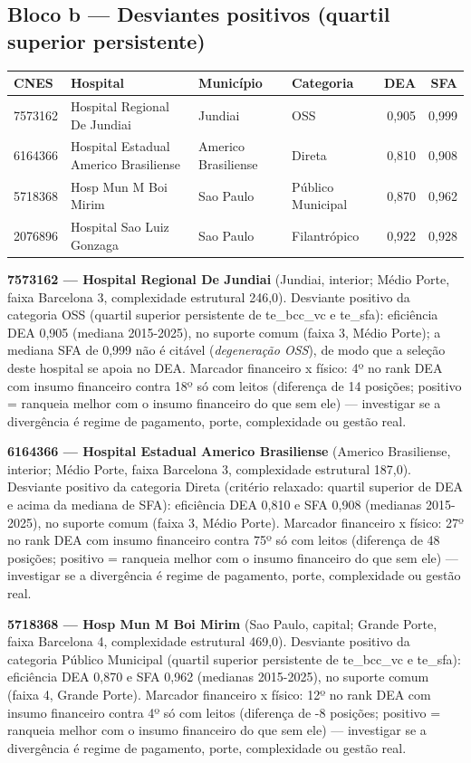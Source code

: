 \documentclass[12pt,a4paper]{article}
\begin{document}
\subsection{Bloco b --- Desviantes positivos (quartil superior persistente)}
\begin{center}\small
\begin{tabular}{llllrr}
\toprule
CNES & Hospital & Município & Categoria & DEA & SFA \\
\midrule
7573162 & Hospital Regional De Jundiai & Jundiai & OSS & 0,905 & 0,999 \\
6164366 & Hospital Estadual Americo Brasiliense & Americo Brasiliense & Direta & 0,810 & 0,908 \\
5718368 & Hosp Mun M Boi Mirim & Sao Paulo & Público Municipal & 0,870 & 0,962 \\
2076896 & Hospital Sao Luiz Gonzaga & Sao Paulo & Filantrópico & 0,922 & 0,928 \\
\bottomrule
\end{tabular}
\end{center}
\noindent\textbf{7573162 --- Hospital Regional De Jundiai} (Jundiai, interior; Médio Porte, faixa Barcelona 3, complexidade estrutural 246,0). Desviante positivo da categoria OSS (quartil superior persistente de te\_bcc\_vc e te\_sfa): eficiência DEA 0,905 (mediana 2015-2025), no suporte comum (faixa 3, Médio Porte); a mediana SFA de 0,999 não é citável (\emph{degeneração OSS}), de modo que a seleção deste hospital se apoia no DEA. Marcador financeiro x físico: 4º no rank DEA com insumo financeiro contra 18º só com leitos (diferença de 14 posições; positivo = ranqueia melhor com o insumo financeiro do que sem ele) — investigar se a divergência é regime de pagamento, porte, complexidade ou gestão real.\par\medskip
\noindent\textbf{6164366 --- Hospital Estadual Americo Brasiliense} (Americo Brasiliense, interior; Médio Porte, faixa Barcelona 3, complexidade estrutural 187,0). Desviante positivo da categoria Direta (critério relaxado: quartil superior de DEA e acima da mediana de SFA): eficiência DEA 0,810 e SFA 0,908 (medianas 2015-2025), no suporte comum (faixa 3, Médio Porte). Marcador financeiro x físico: 27º no rank DEA com insumo financeiro contra 75º só com leitos (diferença de 48 posições; positivo = ranqueia melhor com o insumo financeiro do que sem ele) — investigar se a divergência é regime de pagamento, porte, complexidade ou gestão real.\par\medskip
\noindent\textbf{5718368 --- Hosp Mun M Boi Mirim} (Sao Paulo, capital; Grande Porte, faixa Barcelona 4, complexidade estrutural 469,0). Desviante positivo da categoria Público Municipal (quartil superior persistente de te\_bcc\_vc e te\_sfa): eficiência DEA 0,870 e SFA 0,962 (medianas 2015-2025), no suporte comum (faixa 4, Grande Porte). Marcador financeiro x físico: 12º no rank DEA com insumo financeiro contra 4º só com leitos (diferença de -8 posições; positivo = ranqueia melhor com o insumo financeiro do que sem ele) — investigar se a divergência é regime de pagamento, porte, complexidade ou gestão real.\par\medskip
\end{document}
